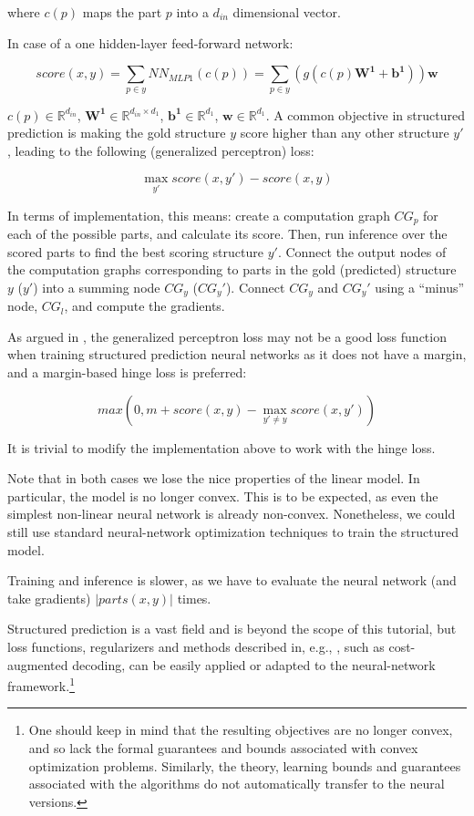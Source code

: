 \documentclass[jair,twoside,11pt,theapa]{article}
\newcommand{\m}[1]{\mathbf{#1}}%
\begin{document}
{\noindent where $c(p)$ maps the part $p$ into a $d_{in}$ dimensional vector. 

In case of a one hidden-layer feed-forward network:

\[
score(x,y) = \sum_{p \in y} NN_{MLP1}(c(p)) = \sum_{p \in y} (g(c(p)\m{W^1} + \m{b^1}))\m{w}
\]

\noindent
$c(p) \in \mathbb{R}^{d_{in}}$,
$\m{W^1} \in \mathbb{R}^{d_{in} \times d_{1}}$,
$\m{b^1} \in \mathbb{R}^{d_1}$,
$\m{w} \in \mathbb{R}^{d_1}$.
A common objective in structured prediction is making the gold structure $y$
score higher than any other structure $y'$, leading to the following
(generalized perceptron) loss:

\[
\max_{y'} score(x,y') - score(x,y)
\]

In terms of implementation, this means: create a computation graph $CG_p$ for
each of the possible parts, and calculate its score. Then, run inference over
the scored parts to find the best scoring structure $y'$. Connect the output
nodes of the computation graphs corresponding to parts in the gold (predicted)
structure $y$ ($y'$) into a summing node $CG_y$ ($CG_y'$). Connect $CG_y$ and
$CG_y'$ using a ``minus'' node, $CG_l$, and compute the gradients. 

As argued in \cite[Section 5]{lecun2006tutorial}, the generalized perceptron loss may not be
a good loss function when training structured prediction neural networks as it
does not have a margin, and a margin-based hinge loss is preferred:

\[
max(0, m + score(x,y) - \max_{y' \neq y} score(x,y'))
\]

\noindent It is trivial to modify the implementation above to work with the hinge loss.

Note that in both cases we lose the nice properties of the linear model. In particular,
the model is no longer convex. This is to be expected, as even the simplest non-linear neural
network is already non-convex. Nonetheless, we could still use standard
neural-network optimization techniques to train the structured model.

Training and inference is slower, as we have to evaluate the neural network (and
take gradients) $|parts(x,y)|$ times.


Structured prediction is a vast field and is beyond the scope of this tutorial,
but loss functions, regularizers and methods described in, e.g.,
\cite{smith2011linguistic}, such as cost-augmented decoding, can be easily
applied or adapted to the neural-network framework.\footnote{One should keep in
mind that the resulting objectives are no longer convex, and so lack the formal
guarantees and bounds associated with convex optimization problems. Similarly,
the theory, learning bounds and guarantees associated with the algorithms do not
automatically transfer to the neural versions.}

}
\end{document}
